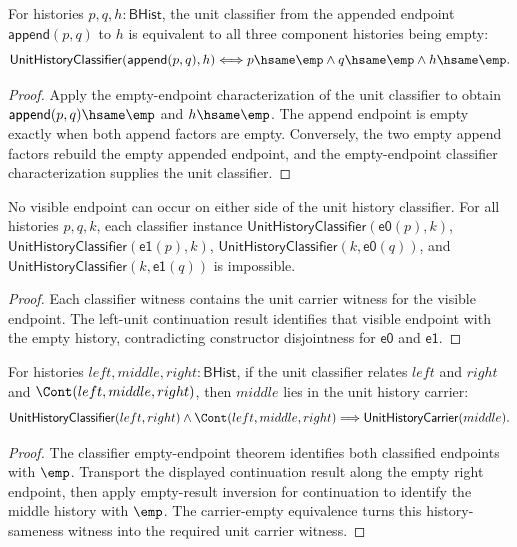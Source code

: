 \begin{theorem}
\label{thm:unit-history-classifier-append-split}
For histories $p,q,h:\mathsf{BHist}$, the unit classifier from the appended
endpoint $\mathsf{append}(p,q)$ to $h$ is equivalent to all three component
histories being empty:
$$
\mathsf{UnitHistoryClassifier}(\mathsf{append}(p,q),h)
\Longleftrightarrow
p\hsame\emp\land q\hsame\emp\land h\hsame\emp.
$$
\end{theorem}
\begin{proof}
Apply the empty-endpoint characterization of the unit classifier to obtain
$\mathsf{append}(p,q)\hsame\emp$ and $h\hsame\emp$. The append endpoint is
empty exactly when both append factors are empty. Conversely, the two empty
append factors rebuild the empty appended endpoint, and the empty-endpoint
classifier characterization supplies the unit classifier.
\end{proof}

\begin{theorem}
\label{thm:unit-history-classifier-visible-endpoint-absurd}
No visible endpoint can occur on either side of the unit history classifier.
For all histories $p,q,k$, each classifier instance
$\mathsf{UnitHistoryClassifier}(\mathsf{e0}(p),k)$,
$\mathsf{UnitHistoryClassifier}(\mathsf{e1}(p),k)$,
$\mathsf{UnitHistoryClassifier}(k,\mathsf{e0}(q))$, and
$\mathsf{UnitHistoryClassifier}(k,\mathsf{e1}(q))$ is impossible.
\end{theorem}
\begin{proof}
Each classifier witness contains the unit carrier witness for the visible
endpoint. The left-unit continuation result identifies that visible endpoint
with the empty history, contradicting constructor disjointness for $\mathsf{e0}$
and $\mathsf{e1}$.
\end{proof}

\begin{theorem}
\label{thm:unit-history-classifier-continuation-middle-carrier}
For histories $left,middle,right:\mathsf{BHist}$, if the unit classifier
relates $left$ and $right$ and $\Cont(left,middle,right)$, then $middle$ lies
in the unit history carrier:
$$
\mathsf{UnitHistoryClassifier}(left,right)\land \Cont(left,middle,right)
\Longrightarrow \mathsf{UnitHistoryCarrier}(middle).
$$
\end{theorem}
\begin{proof}
The classifier empty-endpoint theorem identifies both classified endpoints
with $\emp$. Transport the displayed continuation result along the empty right
endpoint, then apply empty-result inversion for continuation to identify the
middle history with $\emp$. The carrier-empty equivalence turns this
history-sameness witness into the required unit carrier witness.
\end{proof}

